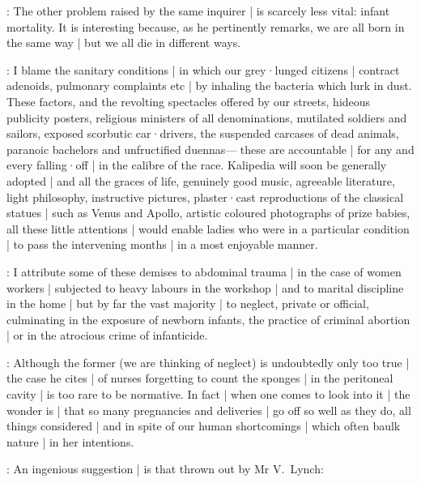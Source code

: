 :
The other problem raised by the same inquirer |
is scarcely less vital:
infant mortality.
It is interesting because,
as he pertinently remarks,
we are all born in the same way |
but we all die in different ways.

\mulligan:
I blame the sanitary conditions |
in which our grey·lunged citizens |
contract adenoids,
pulmonary complaints etc |
by inhaling the bacteria which lurk in dust.
These factors,
and the revolting spectacles offered by our streets,
hideous publicity posters,
religious ministers of all denominations,
mutilated soldiers and sailors,
exposed scorbutic car·drivers,
the suspended carcases of dead animals,
paranoic bachelors and unfructified duennas---%
these are accountable |
for any and every falling·off |
in the calibre of the race.
Kalipedia will soon be generally adopted |
and all the graces of life,
genuinely good music,
agreeable literature,
light philosophy,
instructive pictures,
plaster·cast reproductions of the classical statues |
such as Venus and Apollo,
artistic coloured photographs of prize babies,
all these little attentions |
would enable ladies who were in a particular condition |
to pass the intervening months |
in a most enjoyable manner.

\crotthers:
I attribute some of these demises to abdominal trauma |
in the case of women workers |
subjected to heavy labours in the workshop |
and to marital discipline in the home |
but by far the vast majority |
to neglect,
private or official,
culminating in the exposure of newborn infants,
the practice of criminal abortion |
or in the atrocious crime of infanticide.

:
Although the former
(we are thinking of neglect)
is undoubtedly only too true |
the case he cites |
of nurses forgetting to count the sponges |
in the peritoneal cavity |
is too rare to be normative.
In fact |
when one comes to look into it |
the wonder is |
that so many pregnancies and deliveries |
go off so well as they do,
all things considered |
and in spite of our human shortcomings |
which often baulk nature |
in her intentions.

:
An ingenious suggestion |
is that thrown out by Mr V.~Lynch:

